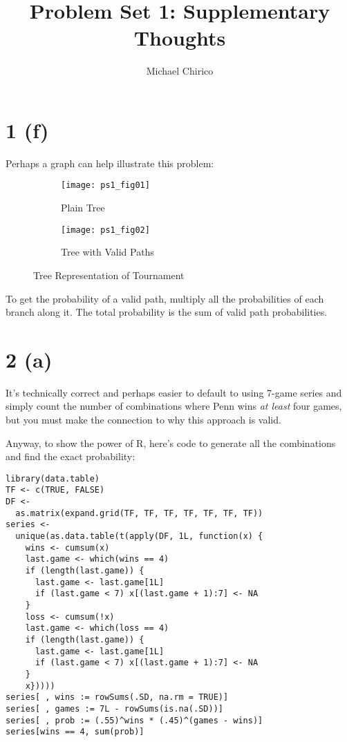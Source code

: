 \documentclass{article}
\begin{document}
\title{Problem Set 1: Supplementary Thoughts}
\author{Michael Chirico}

\maketitle

\section*{1 (f)}

Perhaps a graph can help illustrate this problem:

\begin{figure}[htbp]
	\centering
	\begin{subfigure}{.5\textwidth}
		\texttt{[image: ps1\_fig01]}
		\caption{Plain Tree}
	\end{subfigure}

	\begin{subfigure}{.5\textwidth}
		\texttt{[image: ps1\_fig02]}
		\caption{Tree with Valid Paths}
	\end{subfigure}

	\caption{Tree Representation of Tournament}
	\label{fig:tree}
\end{figure}

To get the probability of a valid path, multiply all the probabilities of each branch along it. The total probability is the sum of valid path probabilities.

\section*{2 (a)}

It's technically correct and perhaps easier to default to using 7-game series and simply count the number of combinations where Penn wins \textit{at least} four games, but you must make the connection to why this approach is valid.

Anyway, to show the power of R, here's code to generate all the combinations and find the exact probability:

\begin{lstlisting}
library(data.table)
TF <- c(TRUE, FALSE)
DF <-
  as.matrix(expand.grid(TF, TF, TF, TF, TF, TF, TF))
series <- 
  unique(as.data.table(t(apply(DF, 1L, function(x) {
    wins <- cumsum(x)
    last.game <- which(wins == 4)
    if (length(last.game)) {
      last.game <- last.game[1L]
      if (last.game < 7) x[(last.game + 1):7] <- NA
    }
    loss <- cumsum(!x)
    last.game <- which(loss == 4)
    if (length(last.game)) {
      last.game <- last.game[1L]
      if (last.game < 7) x[(last.game + 1):7] <- NA
    }
    x}))))
series[ , wins := rowSums(.SD, na.rm = TRUE)]
series[ , games := 7L - rowSums(is.na(.SD))]
series[ , prob := (.55)^wins * (.45)^(games - wins)]
series[wins == 4, sum(prob)]
\end{lstlisting}  
\end{document}

